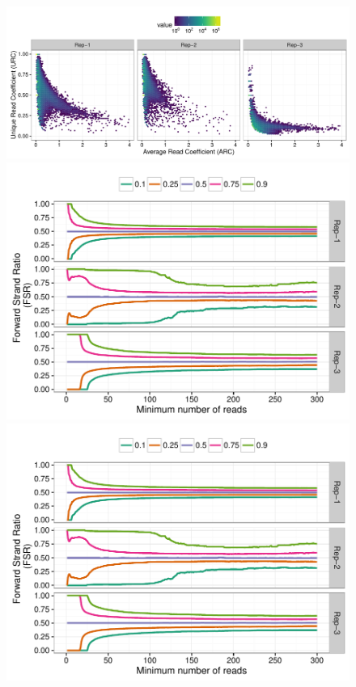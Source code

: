 \documentclass{bmcart}
\begin{document}
\begin{figure}[h!]


  \label{fig:2}
\end{figure}

\newpage


\begin{figure}[h!]
  \centering
  \includegraphics[width = .8\textwidth,page = 1]{figures/fig3/Carroll_FoxA1_mouse_enrichment.pdf}
  \includegraphics[width = .8\textwidth,page = 3]{figures/fig3/Carroll_FoxA1_mouse_strand_imbalance.pdf} 
  \includegraphics[width = .8\textwidth,page = 1]{figures/fig3/Carroll_FoxA1_mouse_strand_imbalance.pdf} 

\end{figure}
\end{document}
